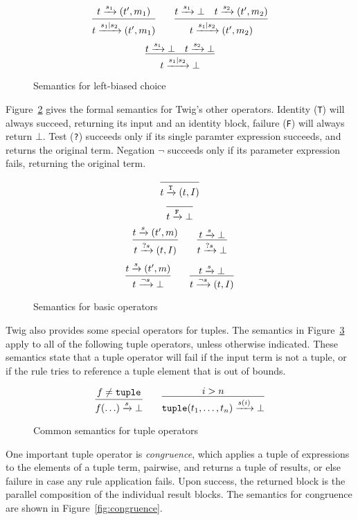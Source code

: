 \begin{figure}[ht]
\[
\infer
  {t \arr{s_1|s_2} (t',m_1)}
  {t \arr{s_1} (t',m_1)}
\qquad
\infer
  {t \arr{s_1|s_2} (t',m_2)}
  {t \arr{s_1} \bot \quad t \arr{s_2} (t',m_2)}
\]
\[
\infer
  {t \arr{s_1|s_2} \bot}
  {t \arr{s_1} \bot \quad t \arr{s_2} \bot}
\]
\caption{Semantics for left-biased choice}
\label{fig:choice}
\end{figure}

Figure~\ref{fig:basic} gives the formal semantics for Twig's other operators. Identity (\texttt{T}) will always succeed, returning its input and an identity block, failure (\texttt{F}) will always return \texttt{$\bot$}. Test (\texttt{?}) succeeds only if its single paramter expression succeeds, and returns the original term. Negation \texttt{$\lnot$} succeeds only if its parameter expression fails, returning the original term.

\begin{figure}[ht]
\[
\infer
  {t \arr{\mathtt{T}} (t,I)}
  {}
\]
\[
\infer
  {t \arr{\mathtt{F}} \bot}
  {}
\]
\[
\infer
  {t \arr{?s} (t,I)}
  {t \arr{s} (t',m)}
\qquad 
\infer
  {t \arr{?s} \bot}
  {t \arr{s} \bot}
\]
\[
\infer
  {t \arr{\lnot s} \bot}
  {t \arr{s} (t',m)}
\qquad 
\infer
  {t \arr{\lnot s} (t,I)}
  {t \arr{s} \bot}
\]
\caption{Semantics for basic operators}
\label{fig:basic}
\end{figure}

Twig also provides some special operators for tuples. The semantics in Figure~\ref{fig:all-tuples} apply to all of the following tuple operators, unless otherwise indicated. These semantics state that a tuple operator will fail if the input term is not a tuple, or if the rule tries to reference a tuple element that is out of bounds.

\begin{figure}[ht]
\[
\infer
  {f(\ldots) \arr{s} \bot}
  {f \neq \mathtt{tuple}}
\qquad
\infer
  {\mathtt{tuple}(t_1,\ldots,t_n) \arr{s(i)} \bot}
  {i > n}
\]
\caption{Common semantics for tuple operators}
\label{fig:all-tuples}
\end{figure}

One important tuple operator is \emph{congruence}, which applies a tuple of expressions to the elements of a tuple term, pairwise, and returns a tuple of results, or else failure in case any rule application fails. Upon success, the returned block is the parallel composition of the individual result blocks. The semantics for congruence are shown in Figure~\ref{fig:congruence}.

